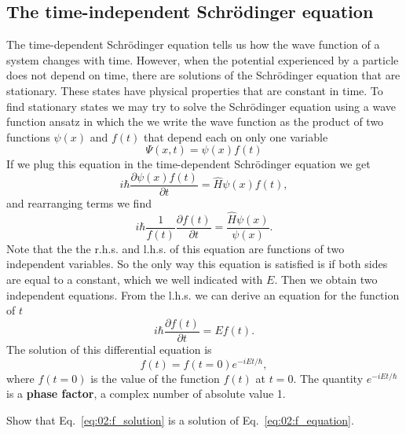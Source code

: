 \documentclass[../Main/chem331-notes.tex]{subfiles}
\begin{document}
\subsection{The time-independent Schr\"{o}dinger equation}
The time-dependent Schr\"{o}dinger equation tells us how the wave function of a system changes with time.
However, when the potential experienced by a particle does not depend on time, there are solutions of the Schr\"{o}dinger equation that are stationary. These states have physical properties that are constant in time.
To find stationary states we may try to solve the Schr\"{o}dinger equation using a wave function ansatz in which the we write the wave function as the product of two functions $\psi(x)$ and $f(t)$ that depend each on only one variable
\begin{equation}
\Psi(x,t) = \psi(x) f(t)
\end{equation}
If we plug this equation in the time-dependent Schr\"{o}dinger equation we get
\begin{equation}
i\hbar \frac{\partial \psi(x) f(t)}{\partial t} = \hat{H}\psi(x) f(t),
\end{equation}
and rearranging terms we find
\begin{equation}
i\hbar \frac{1}{f(t)}\frac{\partial f(t)}{\partial t} = \frac{\hat{H}\psi(x)}{\psi(x)}.
\end{equation}
Note that the the r.h.s. and l.h.s. of this equation are functions of two independent variables.
So the only way this equation is satisfied is if both sides are equal to a constant, which we well indicated with $E$.
Then we obtain two independent equations. From the l.h.s. we can derive an equation for the function of $t$
\begin{equation}
\label{eq:02:f_equation}
i\hbar \frac{\partial f(t)}{\partial t} = E f(t).
\end{equation}
The solution of this differential equation is
\begin{equation}
\label{eq:02:f_solution}
f(t) = f(t = 0) e^{-i E t / \hbar},
\end{equation}
where $f(t = 0)$ is the value of the function $f(t)$ at $t=0$.
The quantity $e^{-i E t / \hbar}$ is a \textbf{phase factor}, a complex number of absolute value 1.
\begin{exercise}
Show that Eq.~\eqref{eq:02:f_solution} is a solution of Eq.~\eqref{eq:02:f_equation}.
\end{exercise}
\end{document}
